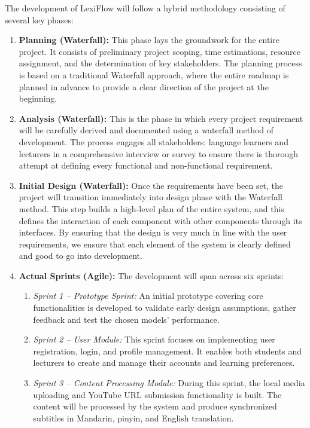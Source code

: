 \documentclass[oneside]{utmthesis}
\begin{document}
The development of LexiFlow will follow a hybrid methodology consisting of several key phases:
\begin{enumerate}[label= (\alph*)]
    \item \textbf{Planning (Waterfall):} This phase lays the groundwork for the entire project. It consists of preliminary project scoping, time estimations, resource assignment, and the determination of key stakeholders. The planning process is based on a traditional Waterfall approach, where the entire roadmap is planned in advance to provide a clear direction of the project at the beginning.

    \item \textbf{Analysis (Waterfall):} This is the phase in which every project requirement will be carefully derived and documented using a waterfall method of development. The process engages all stakeholders: language learners and lecturers in a comprehensive interview or survey to ensure there is thorough attempt at defining every functional and non-functional requirement.

    \item \textbf{Initial Design (Waterfall):} Once the requirements have been set, the project will transition immediately into design phase with the Waterfall method. This step builds a high-level plan of the entire system, and this defines the interaction of each component with other components through its interfaces. By ensuring that the design is very much in line with the user requirements, we ensure that each element of the system is clearly defined and good to go into development.

    \item \textbf{Actual Sprints (Agile):} The development will span across six sprints:
          \begin{enumerate}[label= (\roman*)]
              \item \textit{Sprint 1 – Prototype Sprint:} An initial prototype covering core functionalities is developed to validate early design assumptions, gather feedback and test the chosen models' performance.

              \item \textit{Sprint 2 – User Module:} This sprint focuses on implementing user registration, login, and profile management. It enables both students and lecturers to create and manage their accounts and learning preferences.

              \item \textit{Sprint 3 – Content Processing Module:} During this sprint, the local media uploading and YouTube URL submission functionality is built. The content will be processed by the system and produce synchronized subtitles in Mandarin, pinyin, and English translation.


\end{enumerate}
\end{enumerate}
\end{document}
